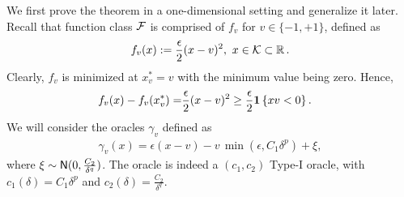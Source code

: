We first prove the theorem in a one-dimensional setting and generalize it later.
Recall that function class $\mathcal{F}$ is comprised of $f_v$ for $v \in \{-1,+1\}$, defined as
\begin{align*}
  f_v(x) := \dfrac{\epsilon}{2} (x - v)^2, \,\, x \in \mathcal{K} \subset \mathbb{R}\,.
\end{align*}
Clearly, $f_v$ is minimized at $x^*_v = v$ with the minimum value being zero.
Hence,
\begin{align}
  f_v(x) - f_v(x^*_v)
  = &  \dfrac{\epsilon}{2} (x - v)^2 \ge  \dfrac{\epsilon}{2}  \mathbf{1}\left\{x v  < 0\right\}. \label{eq:main:fv-lb-main}
\end{align}
We will consider the oracles $\gamma_v$ defined as 
\begin{align}
 \gamma_v(x) = \epsilon(x-v) - v\, \min(\epsilon,C_1 \delta^p) + \xi, \label{eq:main:oracle-1d}
\end{align}
where $\xi \sim \mathsf{N}(0,\frac{C_2}{\delta^q})$.
The oracle is indeed a $(c_1,c_2)$ Type-I oracle, with $c_1(\delta)=C_1\delta^p$ and $c_2(\delta)=\frac{C_2}{\delta^q}$.

